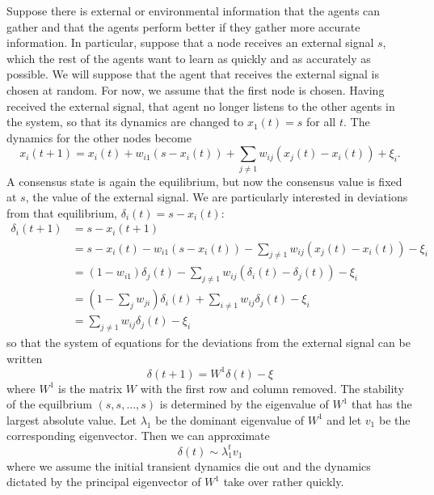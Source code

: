 \documentclass{article}
\begin{document}
Suppose there is external or environmental information that the agents can gather and that the agents perform better if they gather more accurate information.  In particular, suppose that a node receives an external signal $s$, which the rest of the agents want to learn as quickly and as accurately as possible.  We will suppose that the agent that receives the external signal is chosen at random.  For now, we assume that the first node is chosen.   Having received the external signal, that agent no longer listens to the other agents in the system, so that its dynamics are changed to $x_1(t)=s$ for all $t$.   The dynamics for the other nodes become
$$x_i(t+1)=x_i(t)+w_{i1}(s-x_i(t))+\sum_{j\neq 1}w_{ij}(x_j(t)-x_i(t))+\xi_i.$$
A consensus state is again the equilibrium, but now the consensus value is fixed at $s$, the value of the external signal.  We are particularly interested in deviations from that equilibrium, $\delta_i(t)=s-x_i(t)$:
\begin{align*}
\delta_i(t+1)&=s-x_i(t+1)
\\&=s-x_i(t)-w_{i1}(s-x_i(t))-\sum_{j\neq 1}w_{ij}(x_j(t)-x_i(t))-\xi_i
\\&=(1-w_{i1})\delta_j(t)-\sum_{j\neq 1}w_{ij}(\delta_i(t)-\delta_j(t))-\xi_i
\\&=(1-\sum_jw_{ji})\delta_i(t)+\sum_{i\neq 1}w_{ij}\delta_j(t)-\xi_i
\\&=\sum_{j\neq 1}w_{ij}\delta_j(t)-\xi_i
\end{align*}
so that the system of equations for the deviations from the external signal can be written
$$\delta(t+1)=W^1\delta(t)-\xi$$
where $W^1$ is the matrix $W$ with the first row and column removed.  The stability of the equilbrium $(s,s,\dots, s)$ is determined by the eigenvalue of $W^1$ that has the largest absolute value.  Let $\lambda_1$ be the dominant eigenvalue of $W^1$ and let $v_1$ be the corresponding eigenvector.  Then we can approximate
$$\delta(t)\sim\lambda_1^tv_1$$
where we assume the initial transient dynamics die out and the dynamics dictated by the principal eigenvector of $W^1$ take over rather quickly.  

\end{document}
